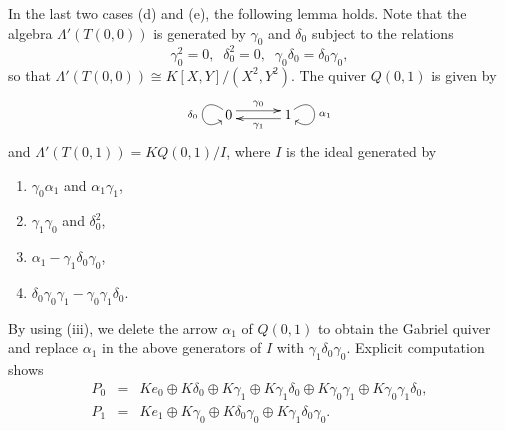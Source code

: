 \documentclass[12pt]{amsart}
\numberwithin{equation}{thm}
\begin{document}
In the last two cases (d) and (e), the following lemma holds. 
Note that the algebra $\Lambda'(T(0,0))$ is generated by $\gamma_0$ and $\delta_0$ subject to the relations
\[
\gamma_0^2=0, \;\; \delta_0^2=0, \;\; \gamma_0\delta_0=\delta_0\gamma_0, 
\]
so that $\Lambda'(T(0,0))\cong K[X,Y]/(X^2, Y^2)$. The quiver $Q(0,1)$ is given by
\[
\begin{xy}
(0,0)*[o]+{0}="A", (15,0)*[o]+{1}="B",
\ar @<1mm> "A";"B"^{\gamma_0}
\ar @<1mm> "B";"A"^{\gamma_1}
\SelectTips{eu}{}
\ar @(ul,dl) "A";"A"_{\delta_0}
\ar @(ur,dr) "B";"B"^{\alpha_1}
\end{xy}
\]
and $\Lambda'(T(0,1))=KQ(0,1)/I$, where $I$ is the ideal generated by 
\begin{enumerate}
\item $\gamma_0\alpha_1$ and $\alpha_1\gamma_1$,
\item $\gamma_1\gamma_0$ and $\delta_0^2$,
\item $\alpha_1 - \gamma_1\delta_0\gamma_0$,
\item $\delta_0\gamma_0\gamma_1-\gamma_0\gamma_1\delta_0$.
\end{enumerate}
By using (iii), we delete the arrow $\alpha_1$ of $Q(0,1)$ to obtain the Gabriel quiver  
and replace $\alpha_1$ in the above generators of $I$ with $\gamma_1\delta_0\gamma_0$. 
Explicit computation shows 
\[\begin{array}{lcl}
P_{0} &=& Ke_0\oplus K\delta_{0}\oplus K\gamma_{1} \oplus K\gamma_1\delta_0\oplus K\gamma_{0}\gamma_{1}\oplus K\gamma_{0}\gamma_{1}\delta_{0}, \\
P_1  &=& Ke_1\oplus K\gamma_0\oplus K\delta_{0}\gamma_0\oplus K\gamma_1\delta_0\gamma_0.      
\end{array} \]
\end{document}
